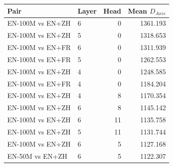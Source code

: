 \begin{tabular}{@{}llrr@{}}
\toprule
Pair & Layer & Head & Mean $D_{Axis}$ \\
\midrule
EN-100M vs EN+ZH & 6 & 0 & 1361.193 \\
EN-100M vs EN+ZH & 5 & 0 & 1318.653 \\
EN-100M vs EN+FR & 6 & 0 & 1311.939 \\
EN-100M vs EN+FR & 5 & 0 & 1262.553 \\
EN-100M vs EN+ZH & 4 & 0 & 1248.585 \\
EN-100M vs EN+FR & 4 & 0 & 1184.204 \\
EN-100M vs EN+ZH & 4 & 8 & 1170.354 \\
EN-100M vs EN+ZH & 6 & 8 & 1145.142 \\
EN-100M vs EN+ZH & 6 & 11 & 1135.758 \\
EN-100M vs EN+ZH & 5 & 11 & 1131.744 \\
EN-100M vs EN+ZH & 6 & 5 & 1127.168 \\
EN-50M vs EN+ZH & 6 & 5 & 1122.307 \\
\bottomrule
\end{tabular}

